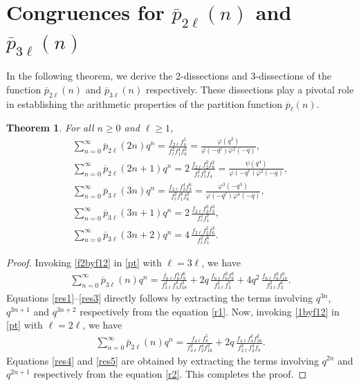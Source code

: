\documentclass[10pt,a4paper]{amsart}
\newtheorem{theorem}{Theorem}[section]
\numberwithin{equation}{section}
\begin{document}
	\section{Congruences for $\overline{p}_{2\ell}(n)$ and $\overline{p}_{3\ell}(n)$}
	In the following theorem, we derive the 2-dissections and 3-dissections of the function $\overline{p}_{2\ell}(n)$ and $\overline{p}_{3\ell}(n)$ respectively. These dissections play a pivotal role in establishing the arithmetic properties of the partition function $\overline{p}_{\ell}(n)$.

	\begin{theorem}\label{t1} For all $n\geq0$ and $\ell\geq1$,
		\begin{align}
			\sum_{n=0}^{\infty}\overline{p}_{2\ell}(2n)q^n=\frac{f_{2\ell}f_4^5}{f_{\ell}^2f_1^4f_{8}^2}=\frac{\varphi(q^2)}{\varphi(-q^\ell)\varphi^2(-q)},\label{res4}\\
			\sum_{n=0}^{\infty}\overline{p}_{2\ell}(2n+1)q^n=2\,\frac{f_{2\ell}f_2^2f_{8}^2}
			{f_{\ell}^2f_1^4f_4} =\frac{\psi(q^4)}{\varphi(-q^\ell)\varphi^2(-q)},\label{res5}\\
			\sum_{n=0}^{\infty}\overline{p}_{3\ell}(3n)q^n=
			\frac{f_{2\ell}f_2^4f_3^6}{f_{\ell}^2f_1^8f_{6}^3}=\frac{\varphi^3(-q^3)}{\varphi(-q^\ell)\varphi^4(-q)},\label{res1}\\
			\sum_{n=0}^{\infty}\overline{p}_{3\ell}(3n+1)q^n=
			2\,\frac{f_{2\ell}f_2^3f_3^3}{f_{\ell}^2f_1^7},\label{res2}\\
			\sum_{n=0}^{\infty}\overline{p}_{3\ell}(3n+2)q^n=
			4\,\frac{f_{2\ell}f_2^2f_{6}^3}{f_{\ell}^2f_1^6}.\label{res3}
		\end{align}
	\end{theorem}

	\begin{proof}
		Invoking \eqref{f2byf12} in \eqref{pt} with $\ell=3\ell$, we have
		\begin{align}\label{r1}
			\sum_{n=0}^{\infty}\overline{p}_{3\ell}(n)q^n=
			\frac{f_{6\ell}f_6^4f_9^6}{f_{3\ell}^2f_3^8f_{18}^3}
			+2q\,\frac{f_{6\ell}f_6^3f_9^3}{f_{3\ell}^2f_3^7}
			+4q^2\,\frac{f_{6\ell}f_6^2f_{18}^3}{f_{3\ell}^2f_3^6}.
		\end{align}
		Equations \eqref{res1}--\eqref{res3} directly follows by extracting the terms involving $q^{3n}$, $q^{3n+1}$ and $q^{3n+2}$ respectively from the equation \eqref{r1}. Now, invoking \eqref{1byf12} in \eqref{pt} with $\ell=2\ell$, we have
		\begin{align}
			\sum_{n=0}^{\infty}\overline{p}_{2\ell}(n)q^n=\frac{f_{4\ell}f_8^5}{f_{2\ell}^2f_2^4f_{16}^2}
			+2q\,\frac{f_{4\ell}f_4^2f_{16}^2}
			{f_{2\ell}^2f_2^4f_8}. \label{r2}
		\end{align}
		Equations \eqref{res4} and \eqref{res5} are obtained  by extracting the terms involving $q^{2n}$ and $q^{2n+1}$ respectively from the equation \eqref{r2}. This completes the proof.
	\end{proof}
\end{document}
